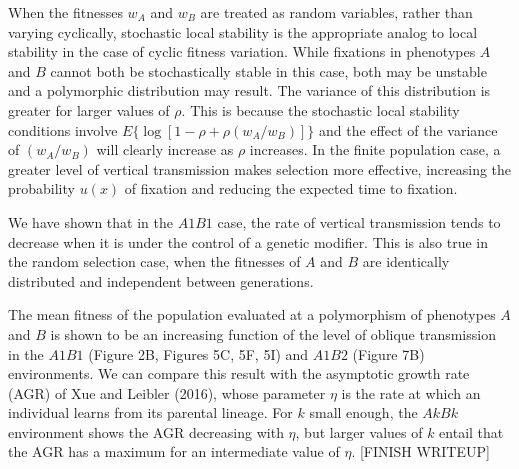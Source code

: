  When the fitnesses $w_A$ and $w_B$ are treated as random variables, rather than varying cyclically, stochastic local stability is the appropriate analog to local stability in the case of cyclic fitness variation. While fixations in phenotypes $A$ and $B$ cannot both be stochastically stable in this case, both may be unstable and a polymorphic distribution may result. The variance of this distribution is greater for larger values of $\rho$. This is because the  stochastic local stability conditions involve $E\bigl\{\log[1-\rho+\rho(w_A/w_B)]\bigr\}$ and the effect of the variance of $(w_A/w_B)$ will clearly increase as $\rho$ increases. In the finite population case, a greater level of vertical transmission makes selection more effective, increasing the probability $u(x)$ of fixation and reducing the expected time to fixation.
 
 We have shown that in the $A1B1$ case, the rate of vertical transmission tends to decrease when it is under the control of a genetic modifier. This is also true in the random selection case, when the fitnesses of $A$ and $B$ are identically distributed and independent between generations. 
 
 The mean fitness of the population evaluated at a polymorphism of phenotypes $A$ and $B$ is shown to be an increasing function of the level of oblique transmission in the $A1B1$ (Figure 2B, Figures 5C, 5F, 5I) and $A1B2$ (Figure 7B) environments. We can compare this result with the asymptotic growth rate (AGR) of Xue and Leibler (2016), whose parameter  $\eta$ is the rate at which an individual learns from its parental lineage. For $k$ small enough, the $AkBk$ environment shows the AGR decreasing with $\eta$, but larger values of $k$ entail that the AGR has a maximum for an intermediate value of $\eta$.  [FINISH WRITEUP]





 
\vfil
 \break
 

